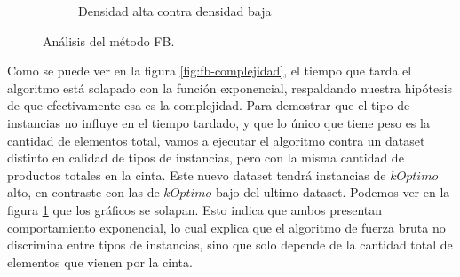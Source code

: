 \documentclass[10pt,a4paper]{article}
\begin{document}
\begin{figure}[h!]
\begin{subfigure}{0.4\linewidth}
		\caption{Densidad alta contra densidad baja}
		\label{fig:fb-densidad}
	\end{subfigure}
    \caption{Análisis del método FB.}
	\label{fig:exp-fb}
\end{figure}

Como se puede ver en la figura \ref{fig:fb-complejidad}, el tiempo que tarda el algoritmo está solapado con la función exponencial, respaldando nuestra hipótesis de que efectivamente esa es la complejidad.
\newline
Para demostrar que el tipo de instancias no influye en el tiempo tardado, y que lo único que tiene peso es la cantidad de elementos total, vamos a ejecutar el algoritmo contra un dataset distinto en calidad de tipos de instancias, pero con la misma cantidad de productos totales en la cinta. Este nuevo dataset tendrá instancias de $kOptimo$ alto, en contraste con las de $kOptimo$ bajo del ultimo dataset.
\newline
\newline
Podemos ver en la figura \ref{fig:fb-densidad} que los gráficos se solapan. Esto indica que ambos presentan comportamiento exponencial, lo cual explica que el algoritmo de fuerza bruta no discrimina entre tipos de instancias, sino que solo depende de la cantidad total de elementos que vienen por la cinta.
\newline
\end{document}
